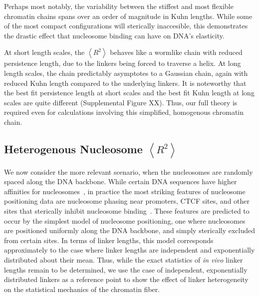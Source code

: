 \documentclass[%
 reprint,
superscriptaddress,
showpacs,preprintnumbers,
 amsmath,amssymb,
 aps,
 prl,
]{revtex4-1}
\newcommand{\RR}{\left\langle{}R^2\right\rangle{}}
\begin{document}
Perhaps most notably, the variability between the stiffest and most flexible
    chromatin chains spans over an order of magnitude in Kuhn lengths.
While some of the most compact configurations will sterically inaccesible, this
    demonstrates the drastic effect that nucleosome binding can have on DNA's
    elasticity.

At short length scales, the $\RR$ behaves like a wormlike chain with reduced
    persistence length, due to the linkers being forced to traverse a helix.
At long length scales, the chain predictably asymptotes to a Gaussian
    chain, again with reduced Kuhn length compared to the underlying linkers.
It is noteworthy that the best fit persistence length at short scales and the
    best fit Kuhn length at long scales are quite different (Supplemental Figure
    XX).
Thus, our full theory is required even for calculations involving this
    simplified, homogenous chromatin chain.


\subsection{\label{sec:hetero-kuhn}Heterogenous Nucleosome
\texorpdfstring{$\RR$}{<R2>}}

We now consider the more relevant scenario, when the nucleosomes are randomly
    spaced along the DNA backbone.
While certain DNA sequences have higher affinities for
    nucleosomes~\cite{something widom}, in practice the most striking features
    of nucleosome positioning data are nucleosome phasing near promoters, CTCF
    sites, and other sites that sterically inhibit nucleosome
    binding~\cite{widom1992}.
These features are predicted to occur by the simplest model of nucleosome
    positioning, one where nucleosomes are positioned uniformly along the DNA
    backbone, and simply sterically excluded from certain sites.
In terms of linker lengths, this model corresponds approximately to the case
    where linker lengths are independent and exponentially distributed about
    their mean.
Thus, while the exact statistics of \textit{in vivo} linker lengths remain to be
    determined, we use the case of independent, exponentially distributed
    linkers as a reference point to show the effect of linker heterogeneity on
    the statistical mechanics of the chromatin fiber.
\end{document}
